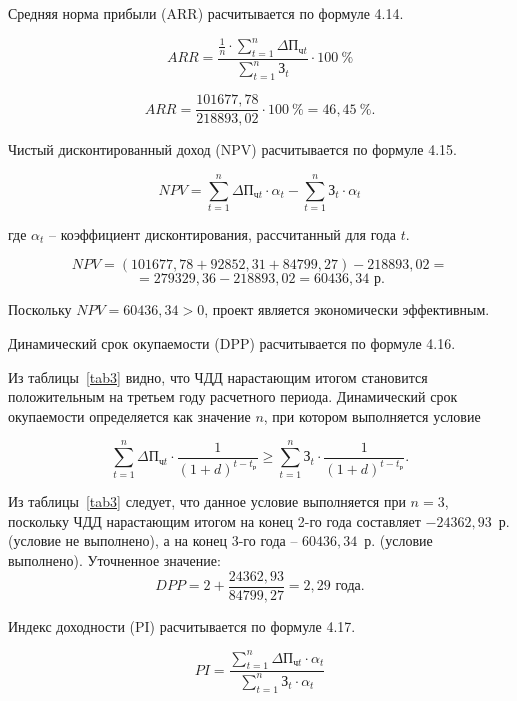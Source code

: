 Средняя норма прибыли (ARR) расчитывается по формуле 4.14.

\begin{equation}
    ARR = \frac{\frac{1}{n} \cdot \sum_{t=1}^{n} \Delta\text{П}_{\text{ч}t}}{\sum_{t=1}^{n} \text{З}_t} \cdot 100~\%
\end{equation}

$$
    ARR = \frac{101677{,}78}{218893{,}02} \cdot 100~\% = 46{,}45~\%.
$$

Чистый дисконтированный доход (NPV) расчитывается по формуле 4.15.

\begin{equation}
    NPV = \sum_{t=1}^{n} \Delta\text{П}_{\text{ч}t} \cdot \alpha_t - \sum_{t=1}^{n} \text{З}_t \cdot \alpha_t
\end{equation}

где $\alpha_t$ -- коэффициент дисконтирования, рассчитанный для года $t$.

$$
    NPV = (101677{,}78 + 92852{,}31 + 84799{,}27) - 218893{,}02 =
$$
$$
    = 279329{,}36 - 218893{,}02 = 60436{,}34 \text{ р}.
$$

Поскольку $NPV = 60436{,}34 > 0$, проект является экономически эффективным.

Динамический срок окупаемости (DPP) расчитывается по формуле 4.16.

Из таблицы~\ref{tab3} видно, что ЧДД нарастающим итогом становится положительным на третьем году расчетного периода. Динамический срок окупаемости определяется как значение $n$, при котором выполняется условие

\begin{equation}
    \sum_{t=1}^{n} \Delta\text{П}_{\text{ч}t} \cdot \frac{1}{(1+d)^{t-t_{\text{р}}}} \geq \sum_{t=1}^{n} \text{З}_t \cdot \frac{1}{(1+d)^{t-t_{\text{р}}}}.
\end{equation}

Из таблицы~\ref{tab3} следует, что данное условие выполняется при $n = 3$, поскольку ЧДД нарастающим итогом на конец 2-го года составляет $-24362{,}93$~р. (условие не выполнено), а на конец 3-го года -- $60436{,}34$~р. (условие выполнено). Уточненное значение:
$$
    DPP = 2 + \frac{24362{,}93}{84799{,}27} = 2{,}29 \text{ года}.
$$

Индекс доходности (PI) расчитывается по формуле 4.17.

\begin{equation}
    PI = \frac{\sum_{t=1}^{n} \Delta\text{П}_{\text{ч}t} \cdot \alpha_t}{\sum_{t=1}^{n} \text{З}_t \cdot \alpha_t}
\end{equation}

